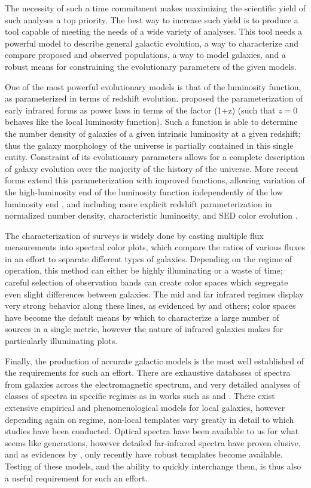 \documentclass[twocolumn,letterpaper,10pt]{article}
\begin{document}
The necessity of such a time commitment makes maximizing the scientific yield of such analyses a top priority. The best way to increase such yield is to produce a tool capable of meeting the needs of a wide variety of analyses. This tool needs a powerful model to describe general galactic evolution, a way to characterize and compare proposed and observed populations, a way to model galaxies, and a robust means for constraining the evolutionary parameters of the given models.

One of the most powerful evolutionary models is that of the luminosity function, as parameterized in terms of redshift evolution. \citet{Saunders90} proposed the parameterization of early infrared forms as power laws in terms of the factor (1+z) (such that $z=0$ behaves like the local luminosity function). Such a function is able to determine the number density of galaxies of a given intrinsic luminosity at a given redshift; thus the galaxy morphology of the universe is partially contained in this single entity. Constraint of its evolutionary parameters allows for a complete description of galaxy evolution over the majority of the history of the universe. More recent forms extend this parameterization with improved functions, allowing variation of the high-luminosity end of the luminosity function independently of the low luminosity end \citep{negrello13}, and including more explicit redshift parameterization in normalized number density, characteristic luminosity, and SED color evolution \citep{marsden11,caputi07}.

The characterization of surveys is widely done by casting multiple flux measurements into spectral color plots, which compare the ratios of various fluxes in an effort to separate different types of galaxies. Depending on the regime of operation, this method can either be highly illuminating or a waste of time; careful selection of observation bands can create color spaces which segregate even slight differences between galaxies. The mid and far infrared regimes display very strong behavior along these lines, as evidenced by \citet{kirk13} and others; color spaces have become the default means by which to characterize a large number of sources in a single metric, however the nature of infrared galaxies makes for particularly illuminating plots.

Finally, the production of accurate galactic models is the most well established of the requirements for such an effort. There are exhaustive databases of spectra from galaxies across the electromagnetic spectrum, and very detailed analyses of classes of spectra in specific regimes as in works such as \citet{elvis94} and \citet{rieke09}. There exist extensive empirical and phenomenological models for local galaxies, however depending again on regime, non-local templates vary greatly in detail to which studies have been conducted. Optical spectra have been available to us for what seems like generations, however detailed far-infrared spectra have proven elusive, and as evidences by \citet{rieke09}, only recently have robust templates become available. Testing of these models, and the ability to quickly interchange them, is thus also a useful requirement for such an effort.
\end{document}
